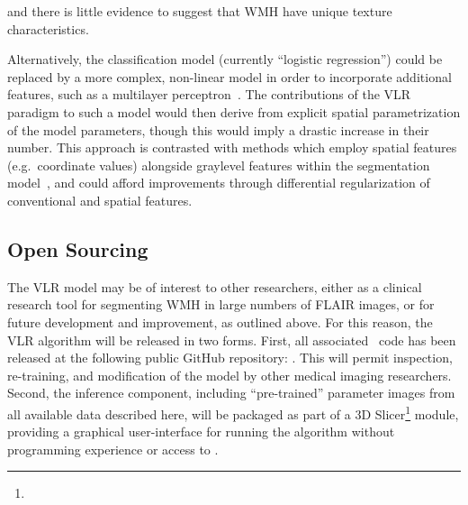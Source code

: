and there is little evidence to suggest that WMH have unique texture characteristics.
\par
Alternatively, the classification model (currently ``logistic regression'') could be
replaced by a more complex, non-linear model in order to incorporate additional features,
such as a multilayer perceptron~\cite{Hornik1989}.
The contributions of the VLR paradigm to such a model would then derive from 
explicit spatial parametrization of the model parameters,
though this would imply a drastic increase in their number.
This approach is contrasted with methods which employ spatial features (e.g.\ coordinate values)
alongside graylevel features within the segmentation model~\cite{Valverde2017},
and could afford improvements through
differential regularization of conventional and spatial features.
\subsection{Open Sourcing}
The VLR model may be of interest to other researchers, either
as a clinical research tool for segmenting WMH in large numbers of FLAIR images,
or for future development and improvement, as outlined above.
For this reason, the VLR algorithm will be released in two forms.
First, all associated \matlab\ code has been released at the following public GitHub repository:
.
This will permit inspection, re-training, and modification of the model
by other medical imaging researchers.
Second, the inference component, including ``pre-trained'' parameter images
from all available data described here,
will be packaged as part of a 3D Slicer\footnote{} module,
providing a graphical user-interface for running the algorithm
without programming experience or access to \matlab.
